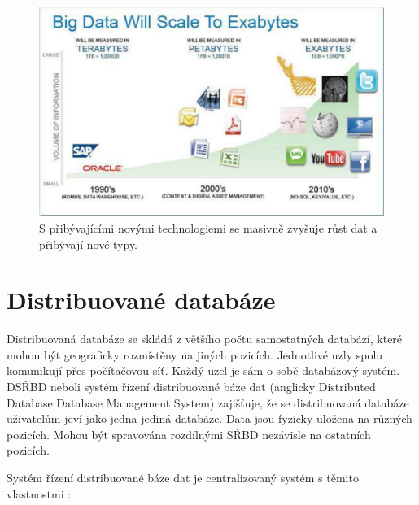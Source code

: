 \begin{figure}[!h]
  \centering
  \includegraphics[width=15cm]{template-fig/big_data_exabytes.pdf}
  \caption{S přibývajícími novými technologiemi se masivně zvyšuje růst dat a přibývají nové typy. \cite{rajeshBigData}}
  \label{FIG_BigDataExabytes}
\end{figure}


\section{Distribuované databáze}
Distribuovaná databáze se skládá z většího počtu samostatných databází, které mohou být geograficky rozmístěny na jiných pozicích. Jednotlivé uzly spolu komunikují přes počítačovou síť. Každý uzel je sám o sobě databázový systém. DSŘBD neboli systém řízení distribuované báze dat (anglicky Distributed Database Database Management System) zajišťuje, že se distribuovaná databáze uživatelům jeví jako jedna jediná databáze. Data jsou fyzicky uložena na různých pozicích. Mohou být spravována rozdílnými SŘBD nezávisle na ostatních pozicích.

\vspace{0.5cm}

\noindent Systém řízení distribuované báze dat je centralizovaný systém s těmito vlastnostmi 
\cite{distributedDBMS}:


